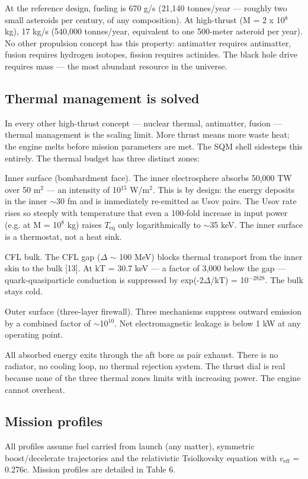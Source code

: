 \documentclass[12pt,a4paper]{article}
\begin{document}
At the reference design, fueling is 670 g/s (21,140 tonnes/year --- roughly two small asteroids per century, of any composition). At high-thrust (M = 2 x 10$^{8}$ kg), 17 kg/s (540,000 tonnes/year, equivalent to one 500-meter asteroid per year). No other propulsion concept has this property: antimatter requires antimatter, fusion requires hydrogen isotopes, fission requires actinides. The black hole drive requires mass --- the most abundant resource in the universe.

\subsection{Thermal management is solved}
In every other high-thrust concept --- nuclear thermal, antimatter, fusion --- thermal management is the scaling limit. More thrust means more waste heat; the engine melts before mission parameters are met. The SQM shell sidesteps this entirely. The thermal budget has three distinct zones:

Inner surface (bombardment face). The inner electrosphere absorbs 50,000 TW over 50 m$^{2}$ --- an intensity of 10$^{15}$ W/m$^{2}$. This is by design: the energy deposits in the inner $\sim$30 fm and is immediately re-emitted as Usov pairs. The Usov rate rises so steeply with temperature that even a 100-fold increase in input power (e.g. at M = 10$^{8}$ kg) raises $T_{\text{eq}}$ only logarithmically to $\sim$35 keV. The inner surface is a thermostat, not a heat sink.

CFL bulk. The CFL gap ($\Delta$ $\sim$ 100 MeV) blocks thermal transport from the inner skin to the bulk [13]. At kT = 30.7 keV --- a factor of 3,000 below the gap --- quark-quasiparticle conduction is suppressed by exp(-2$\Delta$/kT) = 10$^{-2828}$. The bulk stays cold.

Outer surface (three-layer firewall). Three mechanisms suppress outward emission by a combined factor of $\sim$10$^{10}$. Net electromagnetic leakage is below 1 kW at any operating point.

All absorbed energy exits through the aft bore as pair exhaust. There is no radiator, no cooling loop, no thermal rejection system. The thrust dial is real because none of the three thermal zones limits with increasing power. The engine cannot overheat.

\subsection{Mission profiles}
All profiles assume fuel carried from launch (any matter), symmetric boost/decelerate trajectories and the relativistic Tsiolkovsky equation with $v_{\text{eff}}$ = 0.276c. Mission profiles are detailed in Table 6.
\end{document}
